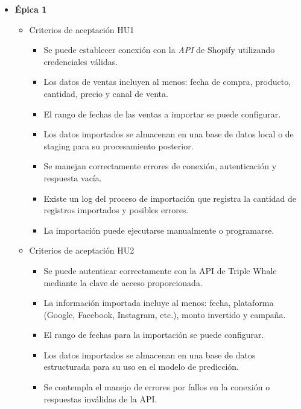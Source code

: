 \documentclass[
11pt, %
]{charter}
\begin{document}
\begin{itemize}
  \item \textbf{\'{E}pica 1}
    \begin{itemize}
      \item Criterios de aceptación HU1
		\begin{itemize}
      \item Se puede establecer conexión con la \textit{API} de Shopify utilizando credenciales válidas.

      \item Los datos de ventas incluyen al menos: fecha de compra, producto, cantidad, precio y canal de venta.

      \item El rango de fechas de las ventas a importar se puede configurar.

      \item Los datos importados se almacenan en una base de datos local o de staging para su procesamiento posterior.

      \item Se manejan correctamente errores de conexión, autenticación y respuesta vacía.

      \item Existe un log del proceso de importación que registra la cantidad de registros importados y posibles errores.

      \item La importación puede ejecutarse manualmente o programarse.      
    \end{itemize}      
      \item Criterios de aceptación HU2
		\begin{itemize}
      \item Se puede autenticar correctamente con la API de Triple Whale mediante la clave de acceso proporcionada.

      \item La información importada incluye al menos: fecha, plataforma (Google, Facebook, Instagram, etc.), monto invertido y campaña.

      \item El rango de fechas para la importación se puede configurar.

      \item Los datos importados se almacenan en una base de datos estructurada para su uso en el modelo de predicción.

      \item Se contempla el manejo de errores por fallos en la conexión o respuestas inválidas de la API.


\end{itemize}
\end{itemize}
\end{itemize}
\end{document}
